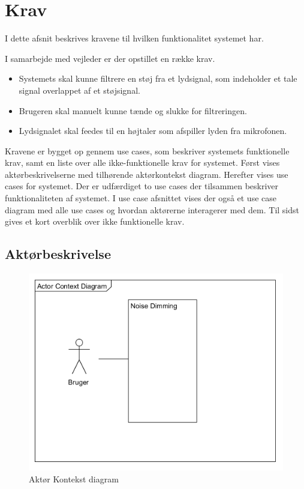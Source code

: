 \graphicspath{{Chapters/Krav/}}

\chapter{Krav}
I dette afsnit beskrives kravene til hvilken funktionalitet systemet har. 


I samarbejde med vejleder er der opstillet en række krav.
\begin{itemize}
\item Systemets skal kunne filtrere en støj fra et lydsignal, som indeholder et tale signal overlappet af et støjsignal.
\item Brugeren skal manuelt kunne tænde og slukke for filtreringen.
\item Lydsignalet skal feedes til en højtaler som afspiller lyden fra mikrofonen. 
\end{itemize}

Kravene er bygget op gennem use cases, som beskriver systemets funktionelle krav, samt en liste over alle ikke-funktionelle krav for systemet. Først vises aktørbeskrivelserne
med tilhørende aktørkontekst diagram. Herefter vises use cases for systemet. Der er udfærdiget to use cases
der tilsammen beskriver funktionaliteten af systemet. I use case afsnittet vises der også et use case diagram
med alle use cases og hvordan aktørerne interagerer med dem. Til sidst gives et kort overblik over ikke funktionelle krav.

\section{Aktørbeskrivelse}

\begin{figure}[H]
	\centering
	\includegraphics[width = 200 pt]{Img/Aktoer_Kontekst.png}
	\caption{Aktør Kontekst diagram}
	\label{fig:Aktoer Kontekst diagram}
\end{figure}

